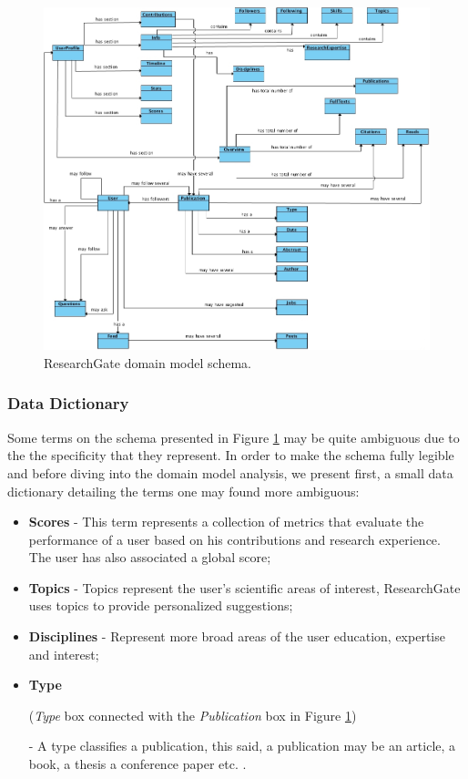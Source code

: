 \begin{figure}[h!]
  \hspace*{-1in}
  \includegraphics[width=1.28\textwidth]{img/researchgate-domain-model.jpg}
\caption{\label{img:rgatedomain} ResearchGate domain model schema.}
\end{figure}

\subsubsection*{Data Dictionary}
Some terms on the schema presented in Figure \ref{img:rgatedomain} may be quite ambiguous due to the the specificity that they represent. In order to make the schema fully legible and before diving into the domain model analysis, we present first, a small data dictionary detailing the terms one may found more ambiguous:

\begin{itemize}
\item \textbf{Scores} - This term represents a collection of metrics that evaluate the performance of a user based on his contributions and research experience. The user has also associated a global score;
\item \textbf{Topics} - Topics represent the user's scientific areas of interest, ResearchGate uses topics to provide personalized suggestions;
\item \textbf{Disciplines} - Represent more broad areas of the user education, expertise and interest;
\item \textbf{Type} \begin{small}(\textit{Type} box connected with the \textit{Publication} box in Figure \ref{img:rgatedomain})\end{small} - A type classifies a publication, this said, a publication may be an article, a book, a thesis a conference paper etc. .
\end{itemize}

